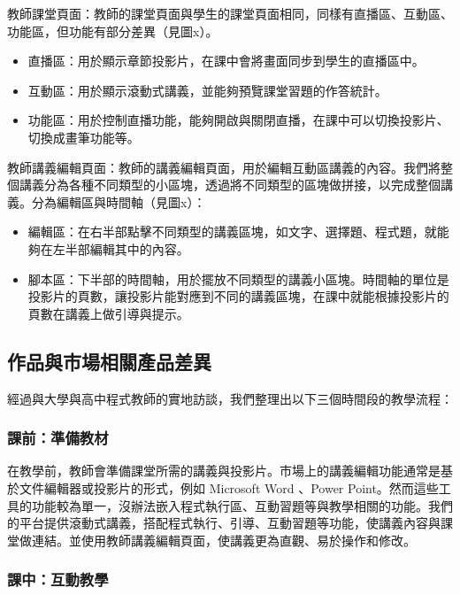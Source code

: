 \documentclass[12pt]{article}
\begin{document}
教師課堂頁面：教師的課堂頁面與學生的課堂頁面相同，同樣有直播區、互動區、功能區，但功能有部分差異（見圖x）。

\begin{itemize}
  \item 直播區：用於顯示章節投影片，在課中會將畫面同步到學生的直播區中。
  \item 互動區：用於顯示滾動式講義，並能夠預覽課堂習題的作答統計。
  \item 功能區：用於控制直播功能，能夠開啟與關閉直播，在課中可以切換投影片、切換成畫筆功能等。
\end{itemize}

教師講義編輯頁面：教師的講義編輯頁面，用於編輯互動區講義的內容。我們將整個講義分為各種不同類型的小區塊，透過將不同類型的區塊做拼接，以完成整個講義。分為編輯區與時間軸（見圖x）：

\begin{itemize}
  \item 編輯區：在右半部點擊不同類型的講義區塊，如文字、選擇題、程式題，就能夠在左半部編輯其中的內容。
  \item 腳本區：下半部的時間軸，用於擺放不同類型的講義小區塊。時間軸的單位是投影片的頁數，讓投影片能對應到不同的講義區塊，在課中就能根據投影片的頁數在講義上做引導與提示。
\end{itemize}

\subsection{作品與市場相關產品差異}

經過與大學與高中程式教師的實地訪談，我們整理出以下三個時間段的教學流程：

\subsubsection{課前：準備教材}

在教學前，教師會準備課堂所需的講義與投影片。市場上的講義編輯功能通常是基於文件編輯器或投影片的形式，例如 Microsoft Word 、Power Point。然而這些工具的功能較為單一，沒辦法嵌入程式執行區、互動習題等與教學相關的功能。我們的平台提供滾動式講義，搭配程式執行、引導、互動習題等功能，使講義內容與課堂做連結。並使用教師講義編輯頁面，使講義更為直觀、易於操作和修改。

\subsubsection{課中：互動教學}
\end{document}

